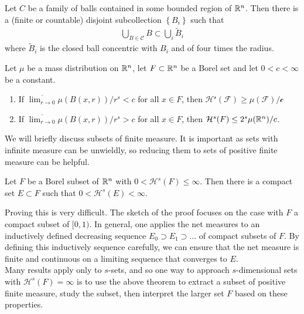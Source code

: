 \documentclass{memoir}
\begin{document}

\begin{lemma}
	Let \(C\) be a family of balls contained in some bounded region of \(\mathbb{R}^{n}\). Then there is a (finite or countable) disjoint subcollection \(\left\{ B_i \right\} \) such that
	\begin{align*}
		\bigcup_{B \in \mathcal{C}} B \subset \bigcup_{i} \tilde{B}_i
	\end{align*}
	where \(\tilde{B}_i\) is the closed ball concentric with \(B_i\) and of four times the radius.
\end{lemma}

\begin{prop}
	Let \(\mu \) be a mass distribution on \(\mathbb{R}^{n}\), let \(F\subset \mathbb{R}^{n}\) be a Borel set and let \(0<c<\infty\) be a constant.
	\begin{enumerate}
		\item If \(\overline{\lim_{r \to 0} }\mu (B(x,r)) / r^{s} < c\) for all \(x \in F\), then \(\mathcal{H^{s}(F) \geq \mu (F) / c}\) 
		\item If \(\overline{\lim_{r \to 0} }\mu (B(x,r)) / r^{s} > c\) for all \(x \in F\), then \(\mathcal{H}^{s}(F) \leq 2^{s}\mu (\mathbb{R}^{n}) / c\).
	\end{enumerate}
\end{prop}

We will briefly discuss subsets of finite measure. It is important as sets with infinite measure can be unwieldly, so reducing them to sets of positive finite measure can be helpful.
\begin{thm}
	Let \(F\) be a Borel subset of \(\mathbb{R}^{n}\) with \(0 < \mathcal{H}^{s}(F) \leq \infty\). Then there is a compact set \(E\subset F\) such that \(0<\mathcal{H}^{s}(E) < \infty\).
\end{thm}
Proving this is very difficult. The sketch of the proof focuses on the case with \(F\) a compact subset of \([0,1)\). In general, one applies the net measures to an inductively defined decreasing sequence \(E_0 \supset E_1 \supset \ldots\) of compact subsets of \(F\). By defining this inductively sequence carefully, we can ensure that the net measure is finite and continuous on a limiting sequence that converges to \(E\).\\

Many results apply only to \(s\)-sets, and so one way to approach \(s\)-dimensional sets with \(\mathcal{H}^{s}(F) = \infty\) is to use the above theorem to extract a subset of positive finite measure, study the subset, then interpret the larger set \(F\) based on these properties.
\end{document}
